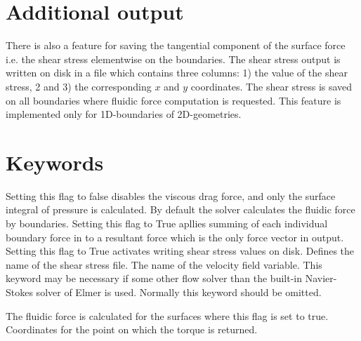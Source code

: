 \section{Additional output}

There is also a feature for saving the tangential component of the
surface force i.e. the shear stress elementwise on the boundaries. The
shear stress output is written on disk in a file which contains three
columns: 1) the value of the shear stress, 2 and 3) the corresponding
$x$ and $y$ coordinates.
The shear stress is saved on all boundaries where fluidic force
computation is requested. This feature is implemented only for
1D-boundaries of 2D-geometries.


\section{Keywords}

\sifbegin
{}
\sifbegin
{}
Setting this flag to false disables the viscous drag force, and only
the surface integral of pressure is calculated.
By default the solver calculates the fluidic force by
boundaries. Setting this flag to True apllies summing of each
individual boundary force in to a resultant force which is the only
force vector in output.
Setting this flag to True activates writing shear stress values on
disk.
Defines the name of the shear stress file.
The name of the velocity field variable. This keyword may be necessary
if some other flow solver than the built-in Navier-Stokes solver of
Elmer is used. Normally this keyword should be omitted.
\sifend

\sifbegin
{}
\sifend

\sifbegin
{}
The fluidic force is calculated for the surfaces where 
this flag is set to true.
Coordinates for the point on which the torque is returned.
\sifend
\sifend



